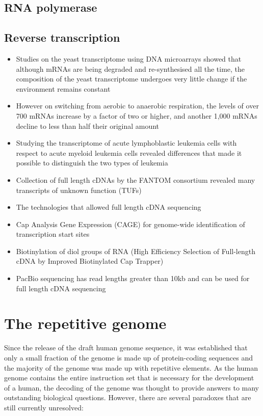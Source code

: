 \subsection{RNA polymerase}

\subsection{Reverse transcription}

\begin{itemize}

   \item Studies on the yeast transcriptome using DNA microarrays showed that although mRNAs are being degraded and re-synthesised all the time, the composition of the yeast transcriptome undergoes very little change if the environment remains constant
   \item However on switching from aerobic to anaerobic respiration, the levels of over 700 mRNAs increase by a factor of two or higher, and another 1,000 mRNAs decline to less than half their original amount
   \item Studying the transcriptome of acute lymphoblastic leukemia cells with respect to acute myeloid leukemia cells revealed differences that made it possible to distinguish the two types of leukemia
   \item Collection of full length cDNAs by the FANTOM consortium revealed many transcripts of unknown function (TUFs)
   \item The technologies that allowed full length cDNA sequencing
   \item Cap Analysis Gene Expression (CAGE) for genome-wide identification of transcription start sites
   \item Biotinylation of diol groups of RNA (High Efficiency Selection of Full-length cDNA by Improved Biotinylated Cap Trapper)
   \item PacBio sequencing has read lengths greater than 10kb and can be used for full length cDNA sequencing

\end{itemize}

\section{The repetitive genome}

Since the release of the draft human genome sequence\cite{venter2001sequence, lander2001initial}, it was established that only a small fraction of the genome is made up of protein-coding sequences and the majority of the genome was made up with repetitive elements. As the human genome contains the entire instruction set that is necessary for the development of a human, the decoding of the genome was thought to provide answers to many outstanding biological questions. However, there are several paradoxes that are still currently unresolved:

